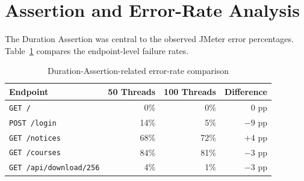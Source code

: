 \documentclass[11pt,a4paper]{article}
\begin{document}






\section{Assertion and Error-Rate Analysis}

The Duration Assertion was central to the observed JMeter error percentages. Table~\ref{tab:errorcomparison} compares the endpoint-level failure rates.

\begin{table}[H]
\centering
\caption{Duration-Assertion-related error-rate comparison}
\label{tab:errorcomparison}
\begin{tabular}{lrrr}
\toprule
\textbf{Endpoint} & \textbf{50 Threads} & \textbf{100 Threads} & \textbf{Difference} \\
\midrule
\texttt{GET /} & 0\% & 0\% & 0 pp \\
\texttt{POST /login} & 14\% & 5\% & $-9$ pp \\
\texttt{GET /notices} & 68\% & 72\% & $+4$ pp \\
\texttt{GET /courses} & 84\% & 81\% & $-3$ pp \\
\texttt{GET /api/download/256} & 4\% & 1\% & $-3$ pp \\
\bottomrule
\end{tabular}
\end{table}
\end{document}
